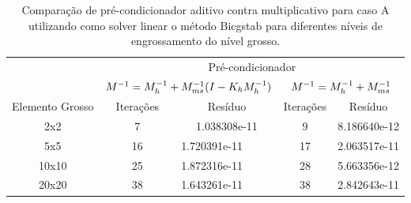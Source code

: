 \begin{table}[]
    \caption{Comparação de pré-condicionador aditivo contra multiplicativo para caso A utilizando como solver linear o método Bicgstab para diferentes níveis de engrossamento do nível grosso.}
    \label{table:precondcasoAcomp}
    \begin{tabular}{c|c|l|c|l|}

    \cline{2-5}
                                          & \multicolumn{4}{c|}{Pré-condicionador}                                                        \\ \cline{2-5} 
                                          & \multicolumn{2}{c|}{$M^{-1}=M^{-1}_{h} + M^{-1}_{ms}(I-K_hM^{-1}_{h})$}               & \multicolumn{2}{c|}{$M^{-1}=M^{-1}_{h} + M^{-1}_{ms}$}                \\ \hline
    \multicolumn{1}{|c|}{Elemento Grosso} & Iterações & \multicolumn{1}{c|}{Resíduo}      & Iterações & \multicolumn{1}{c|}{Resíduo}      \\ \hline
    \multicolumn{1}{|c|}{2x2}             & 7         & \multicolumn{1}{c|}{1.038308e-11} & 9         & \multicolumn{1}{c|}{8.186640e-12} \\ \hline
    \multicolumn{1}{|c|}{5x5}             & 16        & 1.720391e-11                      & 17        & 2.063517e-11                      \\ \hline
    \multicolumn{1}{|c|}{10x10}           & 25        & 1.872316e-11                      & 28        & 5.663356e-12                      \\ \hline
    \multicolumn{1}{|c|}{20x20}           & 38        & 1.643261e-11                      & 38        & 2.842643e-11                      \\ \hline
    \end{tabular}
\end{table}


